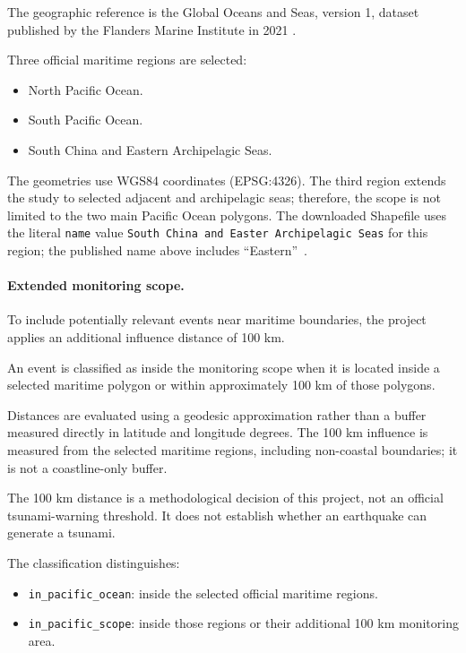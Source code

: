 \documentclass[a4paper,11pt,oneside]{book}
\begin{document}
The geographic reference is the Global Oceans and Seas, version 1,
dataset published by the Flanders Marine Institute in 2021
\cite{marineregions}.

Three official maritime regions are selected:

\begin{itemize}[nosep]
    \item North Pacific Ocean.
    \item South Pacific Ocean.
    \item South China and Eastern Archipelagic Seas.
\end{itemize}

The geometries use WGS84 coordinates (EPSG:4326). The third region
extends the study to selected adjacent and archipelagic seas; therefore,
the scope is not limited to the two main Pacific Ocean polygons.
The downloaded Shapefile uses the literal \texttt{name} value
\texttt{South China and Easter Archipelagic Seas} for this region;
the published name above includes ``Eastern''~\cite{marineregions}.

\paragraph{Extended monitoring scope.}

To include potentially relevant events near maritime boundaries,
the project applies an additional influence distance of 100 km.

An event is classified as inside the monitoring scope when it is
located inside a selected maritime polygon or within approximately
100 km of those polygons.

Distances are evaluated using a geodesic approximation rather than
a buffer measured directly in latitude and longitude degrees.
The 100 km influence is measured from the selected maritime regions,
including non-coastal boundaries; it is not a coastline-only buffer.

The 100 km distance is a methodological decision of this project,
not an official tsunami-warning threshold. It does not establish
whether an earthquake can generate a tsunami.

The classification distinguishes:

\begin{itemize}[nosep]
    \item \texttt{in\_pacific\_ocean}: inside the selected
          official maritime regions.
    \item \texttt{in\_pacific\_scope}: inside those regions or
          their additional 100 km monitoring area.
\end{itemize}
\end{document}
